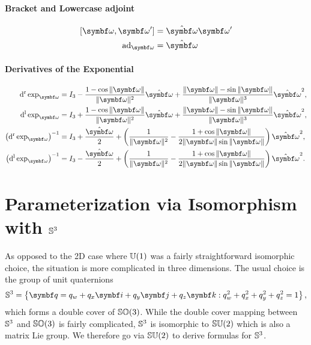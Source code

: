 \begin{properties}[breakable, title={$\SOthree$ formula sheet}]
  \paragraph{Bracket and Lowercase adjoint}
  \begin{subequations}
    \begin{align}
      [\bomega, \bomega'] & = \hat \bomega \bomega' \\
      \ad_\bomega         & = \hat \bomega
    \end{align}
  \end{subequations}

  \paragraph{Derivatives of the Exponential}
  \begin{subequations}
    \begin{align}
      \dr \exp_{\bomega}                     & =        I_3 - \frac{1 - \cos \| \bomega \|}{\| \bomega \|^2} \hat {\bomega} + \frac{ \| \bomega \| - \sin \| \bomega \| }{\| \bomega\|^3} \hat {\bomega}^2, \\
      \dl \exp_{\bomega}                     & = I_3 + \frac{1 - \cos \| \bomega \|}{\| \bomega \|^2} \hat {\bomega} + \frac{ \| \bomega \| - \sin \| \bomega \| }{\| \bomega\|^3} \hat {\bomega}^2,        \\
      \left( \dr \exp_{\bomega} \right)^{-1} & = I_3 + \frac{\hat \bomega}{2} + \left( \frac{1}{\| \bomega \|^2} - \frac{1 + \cos \| \bomega \| }{2 \|\bomega \| \sin \|\bomega \|} \right) \hat \bomega^2, \\
      \left( \dl \exp_{\bomega} \right)^{-1} & = I_3 - \frac{\hat \bomega}{2} + \left( \frac{1}{\| \bomega \|^2} - \frac{1 + \cos \| \bomega \| }{2 \|\bomega \| \sin \|\bomega \|} \right) \hat \bomega^2.
    \end{align}
  \end{subequations}
\end{properties}

\section{Parameterization via Isomorphism with \texorpdfstring{${\mathbb{S}^3}$}{S3}}

As opposed to the 2D case where ${\mathbb{U}(1)}$ was a fairly straightforward isomorphic choice, the situation is more complicated in three dimensions. The usual choice is the group of unit quaternions
\begin{equation}
  \Sthree = \left \{ \bq = q_w + q_x \bi + q_y \bj + q_z \bk  : q_w^2 + q_x^2 + q_y^2 + q_z^2 = 1 \right\},
\end{equation}
which forms a double cover of $\SOthree$.  While the double cover mapping between ${\mathbb{S}^3}$ and $\SOthree$ is fairly complicated, ${\mathbb{S}^3}$ is isomorphic to ${\mathbb{SU}(2)}$ which is also a matrix Lie group. We therefore go via ${\mathbb{SU}(2)}$ to derive formulas for ${\mathbb{S}^3}$.

